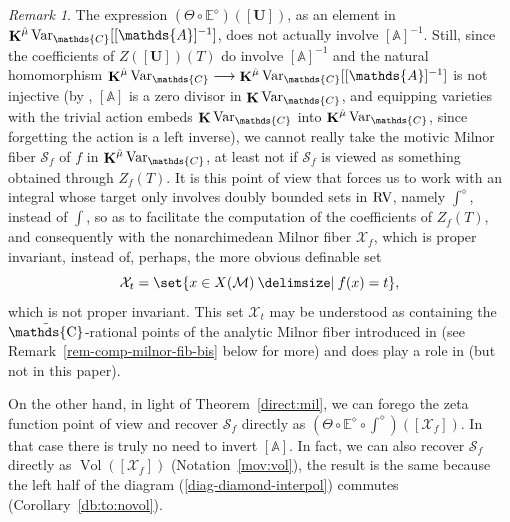 \documentclass[12pt]{amsart}
\theoremstyle{plain}
\theoremstyle{definition}
\theoremstyle{remark}
\newtheorem{rem}[thm]{Remark}
\numberwithin{equation}{section}
\theoremstyle{plain}
\newcommand{\RV}{\textup{RV}}
\newcommand{\MM}{\mdl M}
\newcommand{\A}{\mathds{A}}
\newcommand{\C}{\mathds{C}}
\newcommand{\0}{\emptyset}
\newcommand{\mdl}[1]{\mathcal{#1}}  %
\newcommand{\bb}[1]{\mathbb{#1}}
\newcommand{\fun}{\longrightarrow}
\providecommand\given{}
\newcommand\SetSymbol[1][]{%
\nonscript \: #1 \vert
\allowbreak
\nonscript\:
\mathopen{}}
\renewcommand\given{\SetSymbol[\delimsize]}
\DeclareMathOperator{\ggk}{\mathbf{K}}
\newcommand{\var}{\textup{Var}}
\DeclareMathOperator{\puC}{\tilde \C}
\DeclareMathOperator{\Vol}{Vol}
\newcommand{\gmv}{\ggk^{\hat \mu}\var_{\C}}
\begin{document}
\begin{rem}\label{rem-comp-milnor-fib}
The expression $(\Theta \circ \bb E^{\diamond})([\bm U])$, as an element in $\gmv[[\A]^{-1}]$, does not actually involve  $[\A]^{-1}$. Still, since the coefficients of $Z([\bm U])(T)$ do involve $[\A]^{-1}$ and the natural homomorphism $\gmv \fun \gmv[[\A]^{-1}]$ is not injective (by \cite{borisov:zero:divisor}, $[\A]$ is a zero divisor in $\ggk \var_{\C}$, and equipping varieties with the trivial action embeds $\ggk \var_{\C}$ into $\gmv$, since forgetting the action is a left inverse), we cannot really take  the motivic Milnor fiber $\mathscr S_f$ of $f$ in $\gmv$, at least not if $\mathscr S_f$ is viewed as something obtained through  $Z_f(T)$. It is this point of view that forces us to work with an integral whose target only involves doubly bounded sets in $\RV$, namely $\int^{\diamond}$, instead of $\int$, so as to facilitate the computation of the coefficients of $Z_f(T)$, and consequently with the nonarchimedean Milnor fiber $\mdl X_f$, which is proper invariant, instead of, perhaps, the more obvious definable set
\[
\mdl X_t = \set{x \in X(\MM) \given f(x) = t},
\]
which is not proper invariant. This set $\mdl X_t$ may be understood as containing the $\puC$-rational points of  the analytic Milnor fiber introduced in \cite{nicaise:sebag:motivic:serre} (see Remark~\ref{rem-comp-milnor-fib-bis} below for more) and does play a role in \cite{hru:loe:lef} (but not in this paper).


On the other hand, in light of Theorem~\ref{direct:mil}, we can forego the zeta function point of view and recover $\mathscr S_f$ directly as $(\Theta \circ \bb E^{\diamond} \circ \int^{\diamond})([\mdl X_f])$. In that case there is truly no need to invert $[\A]$. In fact, we can also recover $\mathscr S_f$  directly as  $\Vol([\mdl X_f])$ (Notation~\ref{mov:vol}), the result is the same because the left half of the diagram (\ref{diag-diamond-interpol}) commutes (Corollary~\ref{db:to:novol}).
\end{rem}
\end{document}
